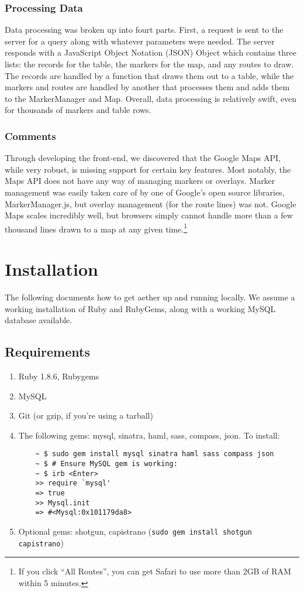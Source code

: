 \subsubsection{Processing Data}
Data processing was broken up into fourt parts. First, a request is sent to the server for a query along with whatever parameters were needed. The server responds with a JavaScript Object Notation (JSON) Object which contains three lists: the records for the table, the markers for the map, and any routes to draw. The records are handled by a function that draws them out to a table, while the markers and routes are handled by another that processes them and adds them to the MarkerManager and Map. Overall, data processing is relatively swift, even for thousands of markers and table rows.

\subsubsection{Comments}
Through developing the front-end, we discovered that the Google Maps API, while very robust, is missing support for certain key features. Most notably, the Maps API does not have any way of managing markers or overlays. Marker management was easily taken care of by one of Google's open source libraries, MarkerManager.js, but overlay management (for the route lines) was not. Google Maps scales incredibly well, but browsers simply cannot handle more than a few thousand lines drawn to a map at any given time.\footnote{If you click ``All Routes'', you can get Safari to use more than 2GB of RAM within 5 minutes.}

\section{Installation}
The following documents how to get aether up and running locally. We assume a working installation of Ruby and RubyGems, along with a working MySQL database available.

\subsection{Requirements}
\begin{enumerate}
  \item Ruby 1.8.6, Rubygems
  \item MySQL
  \item Git (or gzip, if you're using a tarball)
  \item The following gems: mysql, sinatra, haml, sass, compass, json. To install:
  \begin{verbatim}
    ~ $ sudo gem install mysql sinatra haml sass compass json
    ~ $ # Ensure MySQL gem is working:
    ~ $ irb <Enter>
    >> require `mysql'
    => true
    >> Mysql.init
    => #<Mysql:0x101179da8>
  \end{verbatim}
  \item Optional gems: shotgun, capistrano (\verb!sudo gem install shotgun capistrano!)
\end{enumerate}

